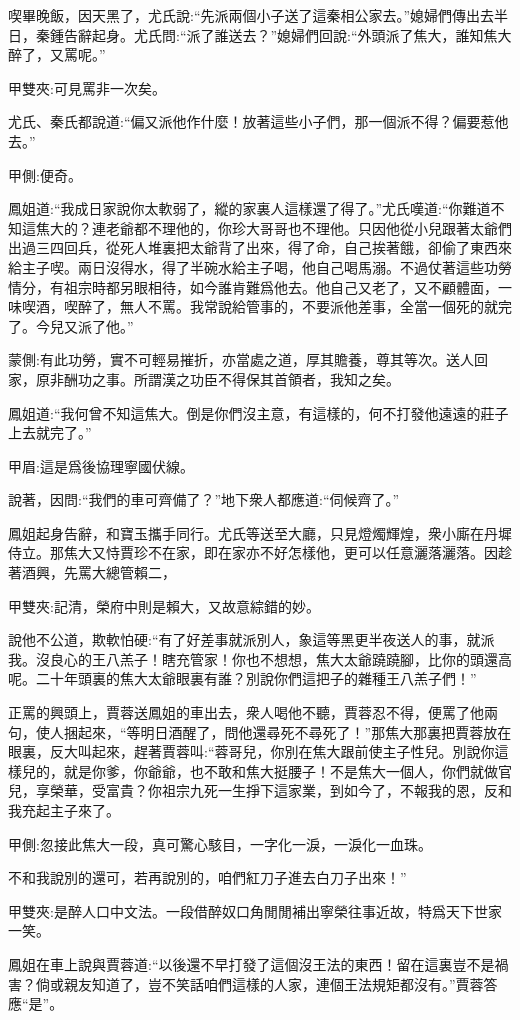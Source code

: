 \begin{parag}
    喫畢晚飯，因天黑了，尤氏說:“先派兩個小子送了這秦相公家去。”媳婦們傳出去半日，秦鍾告辭起身。尤氏問:“派了誰送去？”媳婦們回說:“外頭派了焦大，誰知焦大醉了，又罵呢。”\begin{note}甲雙夾:可見罵非一次矣。\end{note}尤氏、秦氏都說道:“偏又派他作什麼！放著這些小子們，那一個派不得？偏要惹他去。”\begin{note}甲側:便奇。\end{note}鳳姐道:“我成日家說你太軟弱了，縱的家裏人這樣還了得了。”尤氏嘆道:“你難道不知這焦大的？連老爺都不理他的，你珍大哥哥也不理他。只因他從小兒跟著太爺們出過三四回兵，從死人堆裏把太爺背了出來，得了命，自己挨著餓，卻偷了東西來給主子喫。兩日沒得水，得了半碗水給主子喝，他自己喝馬溺。不過仗著這些功勞情分，有祖宗時都另眼相待，如今誰肯難爲他去。他自己又老了，又不顧體面，一味喫酒，喫醉了，無人不罵。我常說給管事的，不要派他差事，全當一個死的就完了。今兒又派了他。”\begin{note}蒙側:有此功勞，實不可輕易摧折，亦當處之道，厚其贍養，尊其等次。送人回家，原非酬功之事。所謂漢之功臣不得保其首領者，我知之矣。\end{note}鳳姐道:“我何曾不知這焦大。倒是你們沒主意，有這樣的，何不打發他遠遠的莊子上去就完了。”\begin{note}甲眉:這是爲後協理寧國伏線。\end{note}說著，因問:“我們的車可齊備了？”地下衆人都應道:“伺候齊了。”
\end{parag}


\begin{parag}
    鳳姐起身告辭，和寶玉攜手同行。尤氏等送至大廳，只見燈燭輝煌，衆小廝在丹墀侍立。那焦大又恃賈珍不在家，即在家亦不好怎樣他，更可以任意灑落灑落。因趁著酒興，先罵大總管賴二，\begin{note}甲雙夾:記清，榮府中則是賴大，又故意綜錯的妙。\end{note}說他不公道，欺軟怕硬:“有了好差事就派別人，象這等黑更半夜送人的事，就派我。沒良心的王八羔子！瞎充管家！你也不想想，焦大太爺蹺蹺腳，比你的頭還高呢。二十年頭裏的焦大太爺眼裏有誰？別說你們這把子的雜種王八羔子們！”
\end{parag}


\begin{parag}
    正罵的興頭上，賈蓉送鳳姐的車出去，衆人喝他不聽，賈蓉忍不得，便罵了他兩句，使人捆起來，“等明日酒醒了，問他還尋死不尋死了！”那焦大那裏把賈蓉放在眼裏，反大叫起來，趕著賈蓉叫:“蓉哥兒，你別在焦大跟前使主子性兒。別說你這樣兒的，就是你爹，你爺爺，也不敢和焦大挺腰子！不是焦大一個人，你們就做官兒，享榮華，受富貴？你祖宗九死一生掙下這家業，到如今了，不報我的恩，反和我充起主子來了。\begin{note}甲側:忽接此焦大一段，真可驚心駭目，一字化一淚，一淚化一血珠。\end{note}不和我說別的還可，若再說別的，咱們紅刀子進去白刀子出來！”\begin{note}甲雙夾:是醉人口中文法。一段借醉奴口角閒閒補出寧榮往事近故，特爲天下世家一笑。\end{note}鳳姐在車上說與賈蓉道:“以後還不早打發了這個沒王法的東西！留在這裏豈不是禍害？倘或親友知道了，豈不笑話咱們這樣的人家，連個王法規矩都沒有。”賈蓉答應“是”。
\end{parag}


